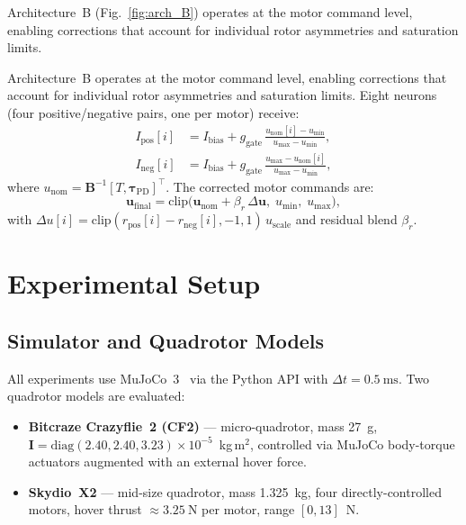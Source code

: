 \documentclass[conference]{IEEEtran}
\begin{document}
Architecture~B (Fig.~\ref{fig:arch_B}) operates at the motor command level, enabling corrections that account for individual rotor asymmetries and saturation limits.

Architecture~B operates at the motor command level, enabling corrections that
account for individual rotor asymmetries and saturation limits.
Eight neurons (four positive/negative pairs, one per motor) receive:
\begin{align}
  I_{\mathrm{pos}}[i] &= I_{\mathrm{bias}} +
    g_{\mathrm{gate}}\,\frac{u_{\mathrm{nom}}[i] - u_{\min}}{u_{\max} - u_{\min}},
  \label{eq:rotor_pos}\\
  I_{\mathrm{neg}}[i] &= I_{\mathrm{bias}} +
    g_{\mathrm{gate}}\,\frac{u_{\max} - u_{\mathrm{nom}}[i]}{u_{\max} - u_{\min}},
  \label{eq:rotor_neg}
\end{align}
where $u_{\mathrm{nom}} = \mathbf{B}^{-1}[T,\boldsymbol{\tau}_{\mathrm{PD}}]^\top$.
The corrected motor commands are:
\begin{equation}
  \mathbf{u}_{\mathrm{final}} =
    \mathrm{clip}\!\bigl(\mathbf{u}_{\mathrm{nom}} + \beta_r\,\Delta\mathbf{u},\;
      u_{\min},\; u_{\max}\bigr),
  \label{eq:rotor_blend}
\end{equation}
with $\Delta u[i] = \mathrm{clip}(r_{\mathrm{pos}}[i] - r_{\mathrm{neg}}[i],-1,1)\,u_{\mathrm{scale}}$
and residual blend $\beta_r$.

\section{Experimental Setup}
\label{sec:experiments}

\subsection{Simulator and Quadrotor Models}

All experiments use MuJoCo~3~\cite{todorov2012mujoco} via the Python API with $\Delta t = \SI{0.5}{\milli\second}$.
Two quadrotor models are evaluated:

\begin{itemize}
  \item \textbf{Bitcraze Crazyflie~2 (CF2)} --- micro-quadrotor,
        mass \SI{27}{\gram}, $\mathbf{I} = \mathrm{diag}(2.40, 2.40, 3.23)
        \times 10^{-5}$~kg\,m$^2$, controlled via MuJoCo body-torque actuators
        augmented with an external hover force.
  \item \textbf{Skydio~X2} --- mid-size quadrotor, mass \SI{1.325}{\kg},
        four directly-controlled motors, hover thrust $\approx\SI{3.25}{\N}$
        per motor, range $[0, 13]$~N.
\end{itemize}
\end{document}
